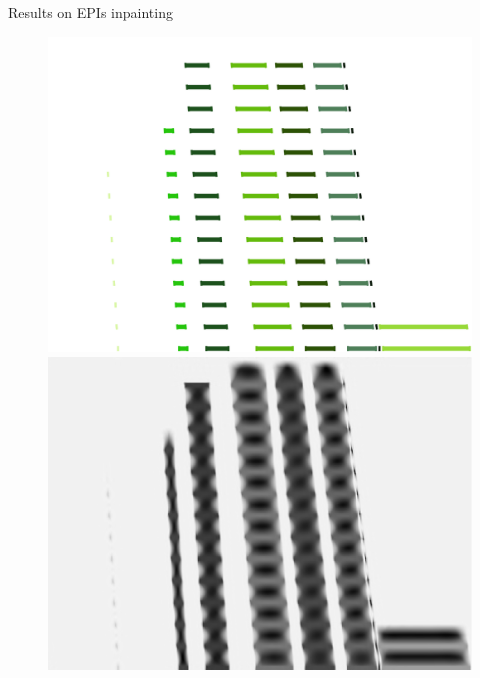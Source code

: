 \begin{frame}{Results on EPIs inpainting}
\begin{figure}[!tbp]
  \centering
  \begin{minipage}[b]{0.40\textwidth}
    \includegraphics[width=\textwidth]{../../Diagrams/results/EPIs/673_10_102_7_48_8_sparse.png}
  \end{minipage}
	\pause
  \begin{minipage}[b]{0.40\textwidth}
    \includegraphics[width=\textwidth]{../../Diagrams/results/Inpainted/673_10_102_7_48_8_inpainted.png}
  \end{minipage}
\end{figure}

\end{frame}


